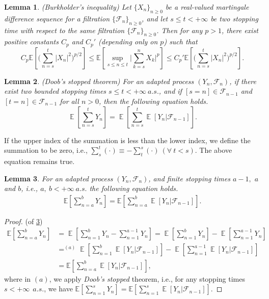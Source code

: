 \documentclass[standalone]{article}
\newcommand{\E}{\mathbb{E}}
\newtheorem{lem}{Lemma}[section]
\DeclareMathOperator{\Expect}{\mathbb{E}}
\begin{document}
\begin{lem}\label{vital2}(Burkholder's inequality)
Let \( \{X_n\}_{n \geq 0} \) be a real-valued martingale difference sequence for a filtration \( \{\mathscr{F}_n\}_{n \geq 0} \), and let \( s\le t<+\infty \) be two stopping time with respect to the same filtration \( \{\mathscr{F}_n\}_{n \geq 0} \). Then for any \( p > 1 \), there exist positive constants \( C_p \) and \( C_p' \) (depending only on \( p \)) such that 
\[C_p \mathbb{E}\left[\bigg(\sum_{n=s}^{t}|X_{n}|^{2}\bigg)^{p/2}\right] \leq \mathbb{E}\left[\sup_{s \leq n \leq t} \bigg|\sum_{k=s}^{n}X_k\bigg|^{p} \right] \leq C_p' \mathbb{E}\left[\bigg(\sum_{n=s}^{t}|X_{n}|^{2}\bigg)^{p/2}\right].\]   
\end{lem}

\begin{lem}\label{vital1}(Doob's stopped theorem)
For an adapted process $(Y_{n}, \mathscr{F}_{n})$, if there exist two bounded stopping times $s \leq t < +\infty\ a.s.$, and if $[s= n] \in \mathscr{F}_{n-1}$ and $[t=n]\in \mathscr{F}_{n-1}$ for all $n > 0$, then the following equation holds.
\[
\Expect\left[\sum_{n=s}^{t}Y_{n}\right] = \Expect\left[\sum_{n=s}^{t}\Expect[Y_{n}|\mathscr{F}_{n-1}]\right].
\]
\end{lem}
If the upper index of the summation is less than the lower index, we define the summation to be zero, i.e., $\sum_{s}^{t}(\cdot) \equiv -\sum_{t}^{s}(\cdot)\ (\forall\ t<s)$. The above equation remains true. 
\begin{lem}\label{sum:expect:ab}
For an adapted process $(Y_{n}, \mathscr{F}_{n})$, and finite stopping times \(a-1,\) \(a\) and \(b\), i.e., $a,\ b<+\infty\ a.s.$
the following equation holds.
\begin{align*}
\E\left[\sum_{n=a}^b Y_n \right] = \E\left[\sum_{n=a}^{b}\Expect[ Y_n|\mathscr{F}_{n-1}] \right].
\end{align*}
\end{lem}
\begin{proof}(of \cref{sum:expect:ab})
\begin{align*}
\E\left[\sum_{n=a}^b Y_n \right]&=\Expect\left[\sum_{n=1}^{b}Y_{n}-\sum_{n=1}^{a-1}Y_{n}\right]=\Expect\left[\sum_{n=1}^{b}Y_{n}\right]-\Expect\left[\sum_{n=1}^{a-1}Y_{n}\right]\\&\mathop{=}^{(a)}\Expect\left[\sum_{n=1}^{b}\Expect\left[Y_{n}|\mathscr{F}_{n-1}\right]\right]-\Expect\left[\sum_{n=1}^{a-1}\Expect\left[Y_{n}|\mathscr{F}_{n-1}\right]\right]\\&=\E\left[\sum_{n=a}^b \Expect[Y_n|\mathscr{F}_{n-1}] \right],
\end{align*}
where in \emph{$(a)$}, we apply \emph{Doob's stopped} theorem, i.e., for any stopping times \(s < +\infty\ \ a.s.\), we have \(\mathbb{E}\left[\sum_{n=1}^{s} Y_n\right] = \mathbb{E}\left[\sum_{n=1}^{s} \Expect[Y_n|\mathscr{F}_{n-1}]\right].\) 
\end{proof}
\end{document}
